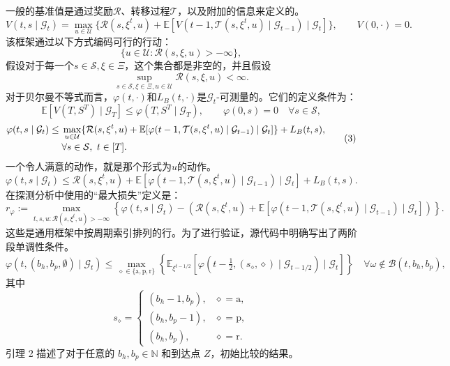 \documentclass{article}
\begin{document}
一般的基准值是通过奖励$\mathcal R$、转移过程$\mathcal T$，以及附加的信息来定义的。
\begin{equation}
V(t,s\mid\mathcal G_t)=\max_{u\in\mathcal U}
\{\mathcal R(s,\xi^t,u)+
\mathbb E[V(t-1,\mathcal T(s,\xi^t,u)\mid\mathcal G_{t-1})\mid\mathcal G_t]\},
\qquad V(0,\cdot)=0.
\tag{2}
\end{equation}
该框架通过以下方式编码可行的行动：
\[
\{u\in\mathcal U:\mathcal R(s,\xi,u)>-\infty\},
\]
假设对于每一个$s\in\mathcal S,\xi\in\Xi$，这个集合都是非空的，并且假设
\[
\sup_{s\in\mathcal S,\xi\in\Xi,u\in\mathcal U}\mathcal R(s,\xi,u)<\infty.
\]
对于贝尔曼不等式而言，$\varphi(t,\cdot)$和$L_B(t,\cdot)$是$\mathcal G_t$-可测量的。它们的定义条件为：
\[
\mathbb E[V(T,S^T)\mid\mathcal G_T]
\le\varphi(T,S^T\mid\mathcal G_T),
\qquad
\varphi(0,s)=0\quad\forall s\in\mathcal S,
\]
\begin{equation}
\begin{aligned}
\varphi(t,s\mid\mathcal G_t)
\le{}&\max_{u\in\mathcal U}
\{\mathcal R(s,\xi^t,u)+
\mathbb E[\varphi(t-1,\mathcal T(s,\xi^t,u)\mid\mathcal G_{t-1})\mid\mathcal G_t]\}
+L_B(t,s),\\[-2pt]
&\hfill\forall s\in\mathcal S,\ t\in[T].
\end{aligned}\tag{3}
\end{equation}
一个令人满意的动作，就是那个形式为$u$的动作。
\begin{equation}
\varphi(t,s\mid\mathcal G_t)
\le\mathcal R(s,\xi^t,u)+
\mathbb E[\varphi(t-1,\mathcal T(s,\xi^t,u)\mid\mathcal G_{t-1})\mid\mathcal G_t]
+L_B(t,s).
\tag{4}
\end{equation}
在探测分析中使用的“最大损失”定义是：
\[
r_\varphi:=
\max_{t,s,u:\mathcal R(s,\xi^t,u)>-\infty}
\left\{\varphi(t,s\mid\mathcal G_t)-
\left(\mathcal R(s,\xi^t,u)+
\mathbb E[\varphi(t-1,\mathcal T(s,\xi^t,u)\mid\mathcal G_{t-1})\mid\mathcal G_t]\right)\right\}.
\]
这些是通用框架中按周期索引排列的行。为了进行验证，源代码中明确写出了两阶段单调性条件。
\[
\varphi(t,(b_h,b_p,\emptyset)\mid\mathcal G_t)
\le\max_{\diamond\in\{\mathrm a,\mathrm p,\mathrm r\}}
\left\{\mathbb E_{\xi^{t-1/2}}
[\varphi(t-\tfrac12,(s_\diamond,\diamond)\mid\mathcal G_{t-1/2})\mid\mathcal G_t]\right\}
\quad\forall\omega\notin\mathcal B(t,b_h,b_p),
\]
其中
\[
s_\diamond=
\begin{cases}
(b_h-1,b_p),&\diamond=\mathrm a,\\
(b_h,b_p-1),&\diamond=\mathrm p,\\
(b_h,b_p),&\diamond=\mathrm r.
\end{cases}
\]
引理 2 描述了对于任意的 $b_h,b_p\in\mathbb N$ 和到达点 $Z$，初始比较的结果。
\end{document}
